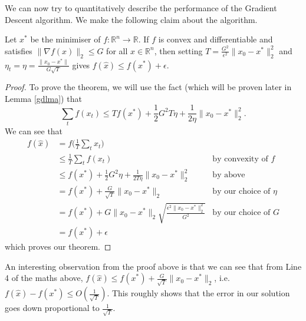 \documentclass[12pt]{article}
\newcommand{\real}{\mathbb{R}}
\begin{document}
We can now try to quantitatively describe the performance of the Gradient Descent algorithm. We make the following claim about the algorithm.
\begin{theorem}
	\label{gdthm}
	Let $x^*$ be the minimiser of $f : \real^n \to \real$. If $f$ is convex and differentiable and satisfies $\|\nabla f(x)\|_2 \leq G$ for all $x\in\real^n$, then setting $T = \frac{G^2}{\epsilon^2}\|x_0 - x^*\|_2^2$ and $\eta_t = \eta = \frac{\|x_0 - x^*\|}{G\sqrt{T}}$ gives $f(\hat{x}) \leq f(x^*) + \epsilon$. 
\end{theorem}
\begin{proof}
	To prove the theorem, we will use the fact (which will be proven later in Lemma \ref{gdlma}) that 
	$$\sum_{t} f(x_t) \leq Tf(x^*) + \frac{1}{2}G^2T\eta + \frac{1}{2\eta}\|x_0 - x^*\|_2^2.$$ 
	We can see that
	\begin{align*}
		f(\hat{x}) &= f\bigg( \frac{1}{T}\sum_{t} x_t\bigg) \\
		&\leq \frac{1}{T}\sum_{t}  f( x_t) &\text{by convexity of $f$}\\
		&\leq f(x^*) + \frac{1}{2}G^2\eta + \frac{1}{2T\eta}\|x_0 - x^*\|_2^2 &\text{by above} \\
		&= f(x^*) + \frac{G}{\sqrt{T}} \|x_0 - x^*\|_2 &\text{by our choice of $\eta$} \\
		&= f(x^*) + G\|x_0 - x^*\|_2 \sqrt{\frac{\epsilon^2 \|x_0 - x^*\|_2^2}{G^2}} &\text{by our choice of $G$} \\
		&=f(x^*) + \epsilon
	\end{align*}
	which proves our theorem.
\end{proof}
An interesting observation from the proof above is that we can see that from Line 4 of the maths above, $f(\hat{x}) \leq f(x^*) + \frac{G}{\sqrt{T}} \|x_0 - x^*\|_2$, i.e. $f(\hat{x}) - f(x^*) \leq O(\frac{1}{\sqrt{T}})$. This roughly shows that the error in our solution goes down proportional to $\frac{1}{\sqrt{T}}$. 
\end{document}
